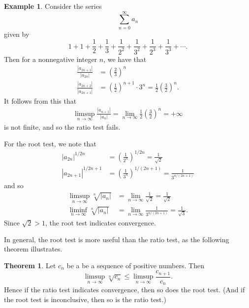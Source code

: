 \documentclass[12pt]{article}
\theoremstyle{definition}
\newtheorem{example}[definition]{Example}
\theoremstyle{theorem}
\newtheorem{theorem}[definition]{Theorem}
\begin{document}
\begin{example}
Consider the series 
\[
\sum_{n=0}^\infty a_n
\]
given by 
\[
1 + 1 + \frac{1}{2} + \frac{1}{3} + \frac{1}{2^2} + \frac{1}{3^2} + \frac{1}{2^3} + \frac{1}{3^3} + \cdots.
\]
Then for a nonnegative integer $n$, we have that 
\begin{align*}
\frac{|a_{2n+1}|}{|a_{2n}|} &= \left(\frac{2}{3}\right)^n \\
\frac{|a_{2n + 2}|}{|a_{2n+1}|} &= \left(\frac{1}{2}\right)^{n+1} \cdot 3^n = \frac{1}{2} \left(\frac{3}{2}\right)^n.
\end{align*}
It follows from this that 
\begin{align*}
\limsup_{n \to \infty} \frac{|a_{n+1}|}{|a_n|} = \lim_{n \to \infty} \frac{1}{2} \left(\frac{3}{2}\right)^n = +\infty
\end{align*}
is not finite, and so the ratio test fails. 

For the root test, we note that 
\begin{align*}
|a_{2n}|^{1/{2n}} &= \left(\frac{1}{2^n}\right)^{1/2n} = \frac{1}{\sqrt{2}} \\
|a_{2n+1}|^{1/{2n+1}} &= \left(\frac{1}{3^n}\right)^{1/(2n+1)} = \frac{1}{3^{n/(2n+1)}}
\end{align*}
and so 
\begin{align*}
\limsup_{n \to \infty}\sqrt[n]{|a_n|} &= \lim_{n \to \infty} \frac{1}{\sqrt{2}} = \frac{1}{\sqrt{2}} \\
\liminf_{n \to \infty}\sqrt[n]{|a_n|} &= \lim_{n \to \infty} \frac{1}{3^{n/(2n+1)}} = \frac{1}{\sqrt{3}}.
\end{align*}
Since $\sqrt{2} > 1$, the root test indicates convergence. 
\end{example}

In general, the root test is more useful than the ratio test, as the following theorem illustrates. 

\begin{theorem}
Let $c_n$ be a be a sequence of positive numbers. Then 
\[
\limsup_{n \to \infty} \sqrt[n]{c_n} \leqslant \limsup_{n \to \infty} \frac{c_{n+1}}{c_n}.
\]
Hence if the ratio test indicates convergence, then so does the root test. (And if the root test is inconclusive, then so is the ratio test.)
\end{theorem}
\end{document}

